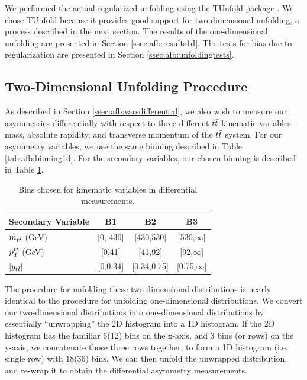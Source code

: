 We performed the actual regularized unfolding using the TUnfold
package \cite{tunfold}. We chose TUnfold because it provides good
support for two-dimensional unfolding, a process described in the next
section. The results of the one-dimensional unfolding are presented in
Section \ref{ssec:afb:results1d}. The tests for bias due to
regularization are presented in Section \ref{ssec:afb:unfoldingtests}.

\subsection{Two-Dimensional Unfolding Procedure}
\label{ssec:afb:unfolding2d}

As described in Section \ref{ssec:afb:varsdifferential}, we also wish
to measure our asymmetries differentially with respect to three
different $t\bar{t}$ kinematic variables -- mass, absolute rapidity, and transverse
momentum of the $t\bar{t}$ system. For our asymmetry variables, we use
the same binning described in Table \ref{tab:afb:binning1d}. For the
secondary variables, our chosen binning is described in Table
\ref{tab:afb:binning2d}.

\begin{table}[htb]
\begin{center}
\caption{Bins chosen for kinematic variables in differential measurements.}
\label{tab:afb:binning2d}
\begin{tabular}{l |  c  c  c }
\hline
Secondary Variable &  B1  &  B2 &  B3 \\ \hline
$m_{t\bar{t}}$ (GeV)    &  [0, 430]  &  [430,530]  &  [530,$\infty$]  \\ \hline
$p_{T}^{t\bar{t}}$ (GeV)    &  [0,41]  &  [41,92]  &  [92,$\infty$] \\ \hline
$|y_{t\bar{t}}|$        &  [0,0.34]  &  [0.34,0.75]  &  [0.75,$\infty$] \\ \hline
 \hline
\end{tabular}
\end{center}
\end{table}

The procedure for unfolding these two-dimensional distributions is
nearly identical to the procedure for unfolding
one-dimensional distributions. We convert our two-dimensional
distributions into one-dimensional distributions by essentially
``unwrapping'' the 2D histogram into a 1D histogram. If the 2D
histogram has the familiar 6(12) bins on the x-axis, and 3 bins (or rows) on the
y-axis, we concatenate those three rows together, to form a 1D histogram
(i.e. single row) with 18(36) bins. We can then unfold the unwrapped
distribution, and re-wrap it to obtain the differential asymmetry
measurements. %

